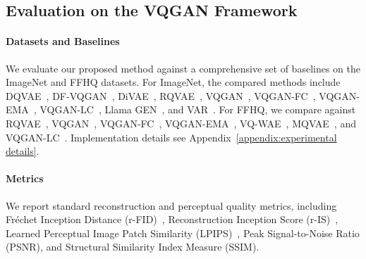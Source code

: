\subsection{Evaluation on the VQGAN Framework}

\paragraph{Datasets and Baselines} We evaluate our proposed method against a comprehensive set of baselines on the ImageNet and FFHQ datasets. For ImageNet, the compared methods include DQVAE~\cite{Huang2023TowardsAI}, DF-VQGAN~\cite{Ni2022NWALIPLI}, DiVAE~\cite{Shi2022DiVAEPI}, RQVAE~\cite{Lee2022AutoregressiveIG}, VQGAN~\cite{Esser2020TamingTF}, VQGAN-FC~\cite{Yu2021VectorquantizedIM}, VQGAN-EMA~\cite{Razavi2019GeneratingDH}, VQGAN-LC~\cite{Zhu2024ScalingTC}, Llama GEN~\cite{Sun2024AutoregressiveMB}, and VAR~\cite{Tian2024VisualAM}.
For FFHQ, we compare against RQVAE~\cite{Lee2022AutoregressiveIG}, VQGAN~\cite{Esser2020TamingTF}, VQGAN-FC~\cite{Yu2021VectorquantizedIM}, VQGAN-EMA~\cite{Razavi2019GeneratingDH}, VQ-WAE~\cite{Vuong2023VectorQW}, MQVAE~\cite{Huang2023NotAI}, and VQGAN-LC~\cite{Zhu2024ScalingTC}. Implementation details see Appendix~\ref{appendix:experimental details}.

\paragraph{Metrics} We report standard reconstruction and perceptual quality metrics, including Fréchet Inception Distance (r-FID)~\cite{Heusel2017GANsTB},
Reconstruction Inception Score (r-IS)~\cite{Salimans2016ImprovedTF},
Learned Perceptual Image Patch Similarity (LPIPS)~\cite{Zhang2018TheUE},
Peak Signal-to-Noise Ratio (PSNR), and Structural Similarity Index Measure (SSIM).




